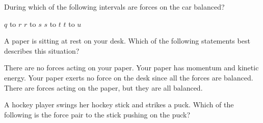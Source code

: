 \documentclass[]{exam}
\begin{document}
\begin{questions}
\begin{center}
\end{center}

During which of the following intervals are forces on the car balanced?

\begin{randomizeoneparchoices}[norandomize]
    \choice $q$ to $r$
    \correctchoice $r$ to $s$
    \choice $s$ to $t$
    \choice $t$ to $u$
\end{randomizeoneparchoices}

\question 
A paper is sitting at rest on your desk.  Which of the following statements best describes this situation?

\begin{randomizechoices}[norandomize]
    \choice There are no forces acting on your paper.
    \choice Your paper has momentum and kinetic energy.
    \choice Your paper exerts no force on the desk since all the forces are balanced.
    \correctchoice There are forces acting on the paper, but they are all balanced.
\end{randomizechoices}

\ifprintanswers
\else
\clearpage
\fi

\question
A hockey player swings her hockey stick and strikes a puck.  Which of the following is the force pair to the stick pushing on the puck?


\end{questions}
\end{document}
